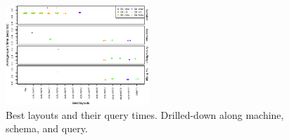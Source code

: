 \documentclass{sig-alternate}
\begin{document}
\begin{figure}[!h]
\vspace{-5pt}
\centering
\includegraphics[width=0.48\textwidth]{pdf/problem_bests_plot.pdf}
\vspace{-20pt}
\caption{Best layouts and their query times. Drilled-down along machine, schema, and query.}  
\label{fig:problem_bests_plot}
\vspace{-10pt}
\end{figure}
\end{document}
